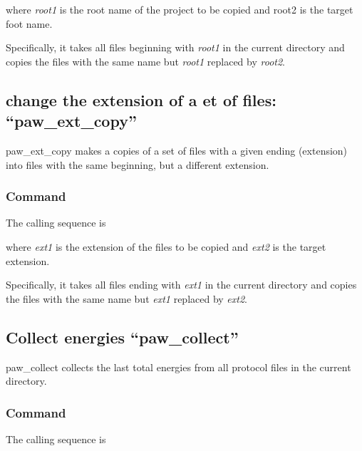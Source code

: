 \documentclass[final,12pt,makeidx,DIV=calc]{article}
\begin{document}
{{{\bigskip{}\bigskip

\noindent where {\it root1} is the root name of the project to be
copied and root2 is the target foot name.

Specifically, it takes all files beginning with {\it root1} in the
current directory and copies the files with the same name but {\it
root1} replaced by {\it root2}.

\subsection{change the extension  of a et of files: ``paw\_ext\_copy''}
paw\_ext\_copy makes a copies of a set of files with a given ending (extension) into files with the same beginning, but a different extension.


\subsubsection{Command}
The calling sequence is

\bigskip{}\bigskip

\noindent where {\it ext1} is the extension of the files to be
copied and \textit{ext2} is the target extension.

Specifically, it takes all files ending with \textit{ext1} in the
current directory and copies the files with the same name but
\textit{ext1} replaced by \textit{ext2}.

\subsection{Collect energies ``paw\_collect''}
paw\_collect collects the last total energies from all protocol files
in the current directory.

\subsubsection{Command}
The calling sequence is

}}}
\end{document}
